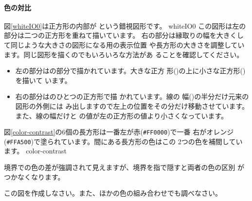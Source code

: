 \iffalse
ここでは属性を別々に指定していますがこれらをまとめて指定できる
\Attrib{style} という属性もあります。この場合は次のように指定できます。
\begin{center}
 \Attrib{style}\Showattrib{="fill:black;stroke:red;stroke-width:4"}
\end{center}
\Showattrib{name="value"}の代わりに \Showattrib{name:value} と表し、属性
同士の間は \Showattrib{;}(セミコロン)で区切ります。
\fi
\newpage
\paragraph{色の対比}
図\ref{whiteIO0}は正方形の内部が
という錯視図形です。
{whiteIO0}
この図形は左の部分は二つの正方形を重ねて描いています。
右の部分は縁取りの幅を大きくして同じような大きさの図形になる用の表示位置
や長方形の大きさを調整しています。同じ図形を描くのでもいろいろな方法があ
ることを確認してください。
\begin{itemize}
 \item 左の部分はの部分で描かれています。大きな正方
       形()の上に小さな正方形()を描いて
       います。
 \item 右の部分はのひとつの正方形で描
       かれています。線の
       幅()の半分だけ元来の図形の外側には
       み出しますので左上の位置をその分だけ移動させています。
       また、線の幅だけと
       の値が左の正方形の値より小さくなっています。
\end{itemize}
\begin{Problem}\upshape\label{prob-contrast}
図\ref{color-contrast}の6個の長方形は一番左が赤(\texttt{\#FF0000})で一番
 右がオレンジ(\texttt{\#FFA500})で塗られています。間にある長方形の色はこの
 2つの色を補間しています\cite[カラー図版3]{Ninio}。
{\protect{}}{color-contrast}

境界での色の差が強調されて見えますが、境界を指で隠すと両者の色の区別
 がつかなくなります。

この図を作成しなさい。また、ほかの色の組み合わせでも調べなさい。
\end{Problem}
